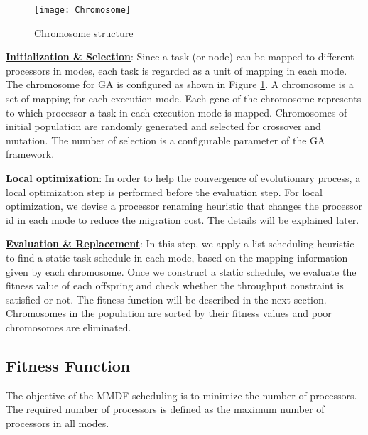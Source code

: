 \documentclass[prodmode,acmtecs]{acmsmall}
\begin{document}
\begin{figure} [ht]
\centerline{\texttt{[image: Chromosome]}}
\caption{Chromosome structure}
\label{Figure:Chromosome}
\end{figure}

\textbf{\underline{Initialization \& Selection}}: Since a task (or node) can be mapped to different processors in modes, each task is regarded as a unit of mapping in each mode. The chromosome for GA is configured as shown in Figure \ref{Figure:Chromosome}. A chromosome is a set of mapping for each execution mode. Each gene of the chromosome represents to which processor a task in each execution mode is mapped. Chromosomes of initial population are randomly generated and selected for crossover and mutation. The number of selection is a configurable parameter of the GA framework.

\vspace{0.2cm}

\textbf{\underline{Local optimization}}: In order to help the convergence of evolutionary process, a local optimization step is performed before the evaluation step. For local optimization, we devise a processor renaming heuristic that changes the processor id in each mode to reduce the migration cost. The details will be explained later.

\vspace{0.2cm}

\textbf{\underline{Evaluation \& Replacement}}: In this step, we apply a list scheduling heuristic to find a static task schedule in each mode, based on the mapping information given by each chromosome. Once we construct a static schedule, we evaluate the fitness value of each offspring and check whether the throughput constraint is satisfied or not. The fitness function will be described in the next section. Chromosomes in the population are sorted by their fitness values and poor chromosomes are eliminated.

\subsection{Fitness Function}
\label{SubSection:Fitness Function}

The objective of the MMDF scheduling is to minimize the number of processors. The required number of processors is defined as the maximum number of processors in all modes.

\begin{definition}
\label{Definition:The number of processors for an MMDF graph}

\end{definition}
\end{document}
